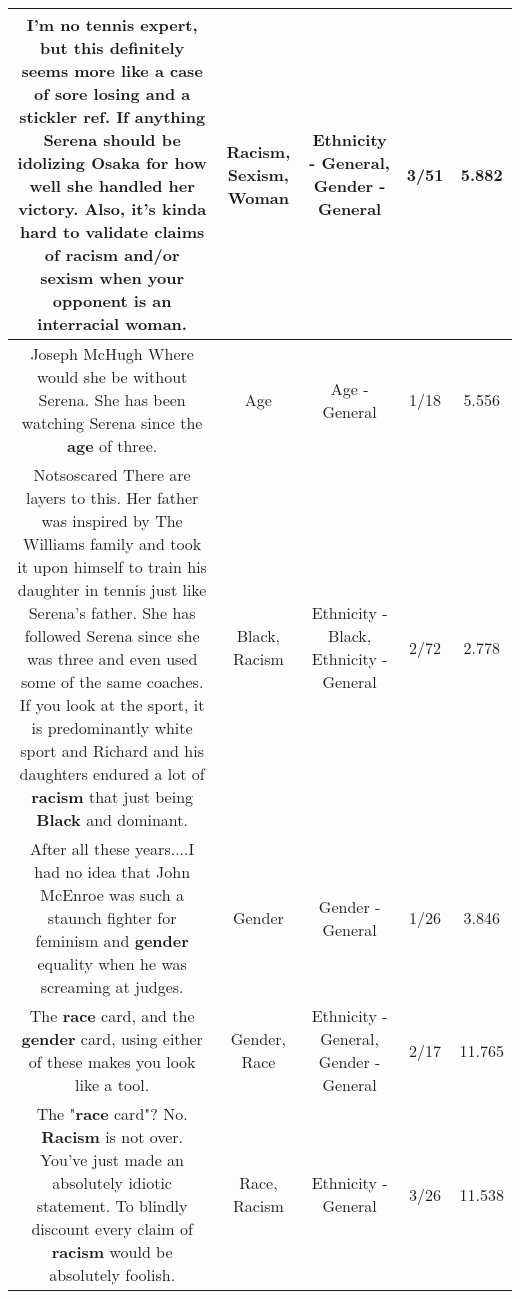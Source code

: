 \documentclass[11pt]{article}
\newlength\mylength
\begin{document}
\begin{center}
\begin{longtable}{|C{.65\mylength}|C{.30\mylength}|C{.12\mylength}|C{.12\mylength}|C{.12\mylength}|}
  \small I'm no tennis expert, but this definitely seems more like a case of sore losing and a stickler ref. If anything Serena should be idolizing Osaka for how well she handled her victory. Also, it's kinda hard to validate claims of \textbf{racism} and/or \textbf{sexism} when your opponent is an interracial \textbf{woman}.\normalsize   & Racism, Sexism, Woman & Ethnicity - General, Gender - General & 3/51 & 5.882 \\  \hline
  \small Joseph McHugh Where would she be without Serena. She has been watching Serena since the \textbf{age} of three.\normalsize   & Age & Age - General & 1/18 & 5.556 \\  \hline
  \small Notsoscared There are layers to this. Her father was inspired by The Williams family and took it upon himself to train his daughter in tennis just like Serena's father. She has followed Serena since she was three and even used some of the same coaches. If you look at the sport, it is predominantly white sport and Richard and his daughters endured a lot of \textbf{racism} that just being \textbf{Black} and dominant.\normalsize   & Black, Racism & Ethnicity - Black, Ethnicity - General & 2/72 & 2.778 \\  \hline
  \small After all these years....I had no idea that John McEnroe was such a staunch fighter for feminism and \textbf{gender} equality when he was screaming at judges.\normalsize   & Gender & Gender - General & 1/26 & 3.846 \\  \hline
  \small The \textbf{race} card, and the \textbf{gender} card, using either of these makes you look like a tool.\normalsize   & Gender, Race & Ethnicity - General, Gender - General & 2/17 & 11.765 \\  \hline
  \small The "\textbf{race} card"? No. \textbf{Racism} is not over. You've just made an absolutely idiotic statement. To blindly discount every claim of \textbf{racism} would be absolutely foolish.\normalsize   & Race, Racism & Ethnicity - General & 3/26 & 11.538 \\  \hline

\end{longtable}
\end{center}
\end{document}
